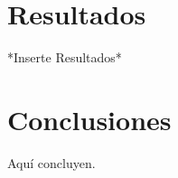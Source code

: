 \documentclass{ci5652}
\begin{document}

\section{Resultados}
*Inserte Resultados*\\


\section*{Conclusiones}

Aquí concluyen.


\small

\end{document}
